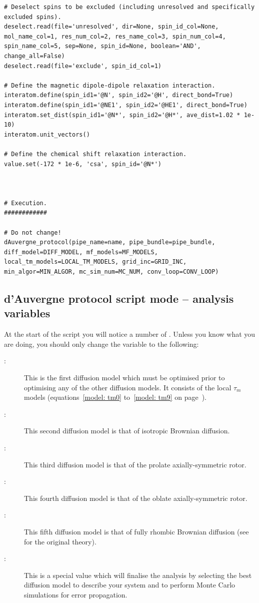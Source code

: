 \begin{htmlonly}
\begin{htmlonly}
\begin{lstlisting}
# Deselect spins to be excluded (including unresolved and specifically excluded spins).
deselect.read(file='unresolved', dir=None, spin_id_col=None, mol_name_col=1, res_num_col=2, res_name_col=3, spin_num_col=4, spin_name_col=5, sep=None, spin_id=None, boolean='AND', change_all=False)
deselect.read(file='exclude', spin_id_col=1)

# Define the magnetic dipole-dipole relaxation interaction.
interatom.define(spin_id1='@N', spin_id2='@H', direct_bond=True)
interatom.define(spin_id1='@NE1', spin_id2='@HE1', direct_bond=True)
interatom.set_dist(spin_id1='@N*', spin_id2='@H*', ave_dist=1.02 * 1e-10)
interatom.unit_vectors()

# Define the chemical shift relaxation interaction.
value.set(-172 * 1e-6, 'csa', spin_id='@N*')



# Execution.
############

# Do not change!
dAuvergne_protocol(pipe_name=name, pipe_bundle=pipe_bundle, diff_model=DIFF_MODEL, mf_models=MF_MODELS, local_tm_models=LOCAL_TM_MODELS, grid_inc=GRID_INC, min_algor=MIN_ALGOR, mc_sim_num=MC_NUM, conv_loop=CONV_LOOP)
\end{lstlisting}



\subsection{d'Auvergne protocol script mode -- analysis variables} \label{sect: d'Auvergne protocol script variables}

At the start of the script you will notice a number of .  Unless you know what you are doing, you should only change the  variable to the following:

\begin{description}
\item[:]  This is the first diffusion model which must be optimised prior to optimising any of the other diffusion models.  It consists of the local $\tau_m$ models (equations~\ref{model: tm0} to~\ref{model: tm9} on page~\pageref{model: tm0}).
\item[:]  This second diffusion model is that of isotropic Brownian diffusion.
\item[:]  This third diffusion model is that of the prolate axially-symmetric rotor.
\item[:]  This fourth diffusion model is that of the oblate axially-symmetric rotor.
\item[:]  This fifth diffusion model is that of fully rhombic Brownian diffusion (see \citet{Perrin34,Perrin36} for the original theory).
\item[:]  This is a special value which will finalise the analysis by selecting the best diffusion model to describe your system and to perform Monte Carlo simulations for error propagation.
\end{description}


\end{htmlonly}
\end{htmlonly}
